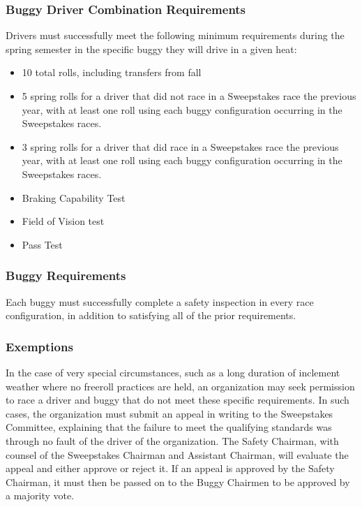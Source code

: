 \subsubsection{Buggy Driver Combination Requirements}
	Drivers must successfully meet the following minimum requirements during the spring semester in the specific buggy they will drive in a given heat:

	\begin{itemize}

		\item 10 total rolls, including transfers from fall
		\item 5 spring rolls for a driver that did not race in a Sweepstakes race the previous year, with at least one roll using each buggy configuration occurring in the Sweepstakes races. 
		\item 3 spring rolls for a driver that did race in a Sweepstakes race the previous year, with at least one roll using each buggy configuration occurring in the Sweepstakes races.
		\item Braking Capability Test
		\item Field of Vision test
		\item Pass Test

	\end{itemize}

\subsubsection{Buggy Requirements}

	Each buggy must successfully complete a safety inspection in every race configuration, in addition to satisfying all of the prior requirements.

\subsubsection{Exemptions}

	In the case of very special circumstances, such as a long duration of inclement weather where no freeroll practices are held, an organization may seek permission to race a driver and buggy that do not meet these specific requirements. In such cases, the organization must submit an appeal in writing to the Sweepstakes Committee, explaining that the failure to meet the qualifying standards was through no fault of the driver of the organization. The Safety Chairman, with counsel of the Sweepstakes Chairman and Assistant Chairman, will evaluate the appeal and either approve or reject it. If an appeal is approved by the Safety Chairman, it must then be passed on to the Buggy Chairmen to be approved by a majority vote.

